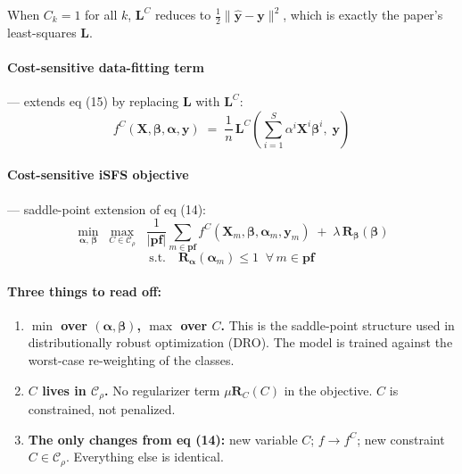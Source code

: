 \documentclass[11pt,a4paper]{article}
\begin{document}
When $C_k = 1$ for all $k$, $\mathbf{L}^C$ reduces to $\frac{1}{2}\|\hat{\mathbf{y}} - \mathbf{y}\|^2$, which is exactly the paper's least-squares $\mathbf{L}$.

\paragraph{Cost-sensitive data-fitting term} --- extends eq (15) by replacing $\mathbf{L}$ with $\mathbf{L}^C$:
\begin{equation}
\boxed{\;f^{C}(\mathbf{X},\boldsymbol{\beta},\boldsymbol{\alpha},\mathbf{y}) \;=\; \frac{1}{n}\,\mathbf{L}^{C}\!\left(\sum_{i=1}^{S}\alpha^{i}\mathbf{X}^{i}\boldsymbol{\beta}^{i},\;\mathbf{y}\right)\;}
\end{equation}

\paragraph{Cost-sensitive iSFS objective} --- saddle-point extension of eq (14):
\begin{equation}
\boxed{\;
\min_{\boldsymbol{\alpha},\,\boldsymbol{\beta}}\;\max_{C \in \mathcal{C}_\rho}\;\;\frac{1}{|\mathbf{pf}|}\sum_{m \in \mathbf{pf}} f^{C}(\mathbf{X}_m,\boldsymbol{\beta},\boldsymbol{\alpha}_m,\mathbf{y}_m) \;+\; \lambda\,\mathbf{R}_{\boldsymbol{\beta}}(\boldsymbol{\beta})
\;}
\end{equation}
\[
\text{s.t.}\quad \mathbf{R}_{\boldsymbol{\alpha}}(\boldsymbol{\alpha}_m) \leq 1\;\;\forall\,m \in \mathbf{pf}
\]

\paragraph{Three things to read off:}
\begin{enumerate}[leftmargin=*,itemsep=2pt]
  \item \textbf{$\min$ over $(\boldsymbol{\alpha}, \boldsymbol{\beta})$, $\max$ over $C$.} This is the saddle-point structure used in distributionally robust optimization (DRO). The model is trained against the worst-case re-weighting of the classes.
  \item \textbf{$C$ lives in $\mathcal{C}_\rho$.} No regularizer term $\mu \mathbf{R}_C(C)$ in the objective. $C$ is constrained, not penalized.
  \item \textbf{The only changes from eq (14):} new variable $C$; $f \to f^C$; new constraint $C \in \mathcal{C}_\rho$. Everything else is identical.
\end{enumerate}
\end{document}
